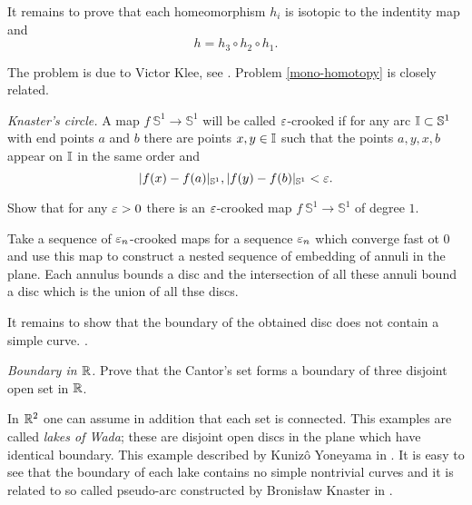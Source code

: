 It remains to prove that each homeomorphism $h_i$ is isotopic to the indentity map and
\[h=h_3\circ h_2\circ h_1.\] 

The problem is due to Victor Klee, 
see \cite{klee}.
Problem \ref{mono-homotopy} is closely related.


\textit{Knaster's circle.}
A map $f\:\mathbb S^1\to\mathbb S^1$ will be called $\varepsilon$-crooked 
if for any arc $\mathbb{I}\subset \mathbb S^1$ with end points $a$ and $b$ there are points $x,y\in \mathbb{I}$ such that the points $a,y,x,b$ appear on $\mathbb{I}$ in the same order and
\[|f(x)-f(a)|_{\mathbb S^1},|f(y)-f(b)|_{\mathbb S^1}<\varepsilon.\]

Show that for any $\varepsilon>0$ there is an $\varepsilon$-crooked map $f\:\mathbb S^1\to\mathbb S^1$ of degree $1$.

Take a sequence of $\varepsilon_n$-crooked maps for a sequence $\varepsilon_n$ which converge fast ot $0$
and use this map to construct a nested sequence of embedding of annuli in the plane.
Each annulus bounds a disc and the intersection 
of all these annuli bound a disc which is the union of all thse discs.

It remains to show that the boundary of the obtained disc does not contain a simple curve.
\cite{wayne}.

\textit{Boundary in $\mathbb{R}$.}
Prove that the Cantor's set forms a boundary of three disjoint open set in $\mathbb{R}$.

In $\mathbb{R}^2$
one can assume in addition that each set is connected.
This examples are called \emph{lakes of Wada};
these are disjoint open discs in the plane which have identical boundary.   
This example described by Kuniz\^{o} Yoneyama in \cite{yoneyama}.
It is easy to see that the boundary of each lake contains no simple nontrivial curves
and it is related to so called pseudo-arc constructed by Bronis{\l}aw Knaster in \cite{knaster}. 

